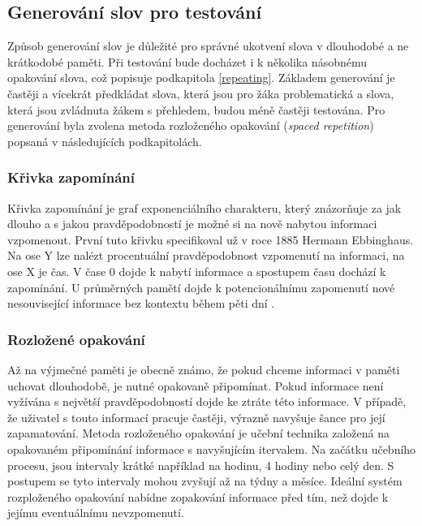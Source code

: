 \documentclass[a4paper,11pt,titlepage,fleqn]{article}
\begin{document}
    \subsection{Generování slov pro testování}
        Způsob generování slov je důležité pro správné ukotvení slova v dlouhodobé a ne krátkodobé paměti. Při testování bude docházet i k několika násobnému opakování slova, což popisuje podkapitola \ref{repeating}. Základem generování je častěji a vícekrát předkládat slova, která jsou pro žáka problematická a slova, která jsou zvládnuta žákem s přehledem, budou méně častěji testována. Pro generování byla zvolena metoda rozloženého opakování (\textit{spaced repetition}) popsaná v následujících podkapitolách.
	
        \subsubsection{Křivka zapomínání}
                Křivka zapomínání je graf exponenciálního charakteru, který znázorňuje za jak dlouho a s jakou pravděpodobností je možné si na nově nabytou informaci vzpomenout. První tuto křivku specifikoval už v roce 1885 Hermann Ebbinghaus. Na ose Y lze nalézt procentuální pravděpodobnost vzpomenutí na informaci, na ose X je čas. V čase 0 dojde k nabytí informace a spostupem času dochází k zapomínání. U průměrných pamětí dojde k potencionálnímu zapomenutí nové nesouvisející informace bez kontextu během pěti dní .

        \subsubsection{Rozložené opakování} %
            Až na výjmečné paměti je obecně známo, že pokud chceme informaci v paměti uchovat dlouhodobě, je nutné opakovaně připomínat. Pokud informace není vyžívána s největší pravděpodobností dojde ke ztráte této informace. V případě, že uživatel s touto informací pracuje častěji, výrazně navyšuje šance pro její zapamatování. Metoda rozloženého opakování je učební technika založená na opakovaném připomínání informace s navyšujícím itervalem. Na začátku učebního procesu, jsou intervaly krátké například na hodinu, 4 hodiny nebo celý den. S postupem se tyto intervaly mohou zvyšují až na týdny a měsíce. Ideální systém rozploženého opakování nabídne zopakování informace před tím, než dojde k jejímu eventuálnímu nevzpomenutí.
\end{document}
